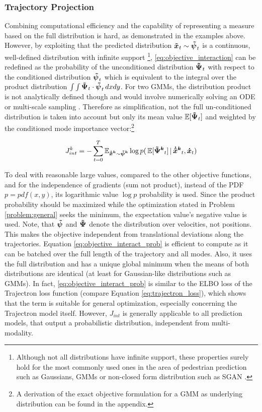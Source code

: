 \subsubsection{Trajectory Projection}
Combining computational efficiency and the capability of representing a measure based on the full distribution is hard, as demonstrated in the examples above. However, by exploiting that the predicted distribution $\xped[]_t \sim \dist[]_t$ is a continuous, well-defined distribution with infinite support \footnote{Although not all distributions have infinite support, these properties surely hold for the most commonly used ones in the area of pedestrian prediction such as Gaussians, \ac{GMM}s \cite{Salzmann2020} or non-closed form distribution such as SGAN \cite{Gupta2018}.}, \ref{eq:objective_interaction} can be redefined as the probability of the unconditioned distribution $\distwo[]_t$ with respect to the conditioned distribution $\dist[]_t$ which is equivalent to the integral over the product distribution $\int \int \distwo[]_t \cdot \dist[]_t \, dxdy$.
\newline
For two \ac{GMM}s, the distribution product is not analytically defined though and would involve numerically solving an \ac{ODE} \cite{Schrempf2005} or multi-scale sampling \cite{Ihler2003}. Therefore as simplification, not the full un-conditioned distribution is taken into account but only its mean value $\mathbb{E}[\distwo[]_t]$ and weighted by the conditioned mode importance vector:\footnote{A derivation of the exact objective formulation for a \ac{GMM} as underlying distribution can be found in the appendix.}

\begin{equation}
J_{int}^k = - \sum_{t=0}^T \mathbb{E}_{\dxped[k] \sim \dist[k]} \log p(\, \mathbb{E}[\distwo[k]_t] \, | \, \dxped[k]_t, \dx_t)
\label{eq:objective_interact_prob}
\end{equation}

To deal with reasonable large values, compared to the other objective functions, and for the independence of gradients (sum not product), instead of the \ac{PDF} $p = pdf(x, y)$, its logarithmic value $\log p$ probability is used. Since the product probability should be maximized while the optimization stated in Problem \ref{problem:general} seeks the minimum, the expectation value's negative value is used. Note, that $\dist[]$ and $\distwo[]$ denote the distribution over velocities, not positions. This makes the objective independent from translational deviations along the trajectories.
\newline
Equation \ref{eq:objective_interact_prob} is efficient to compute as it can be batched over the full length of the trajectory and all modes. Also, it uses the full distribution and has a unique global minimum when the means of both distributions are identical (at least for Gaussian-like distributions such as \ac{GMM}s). In fact, \ref{eq:objective_interact_prob} is similar to the \ac{ELBO} loss of the Trajectron loss function (compare Equation \ref{eq:trajectron_loss}), which shows that the term is suitable for general optimization, especially concerning the Trajectron model itself. However, $J_{int}$ is generally applicable to all prediction models, that output a probabilistic distribution, independent from multi-modality.
